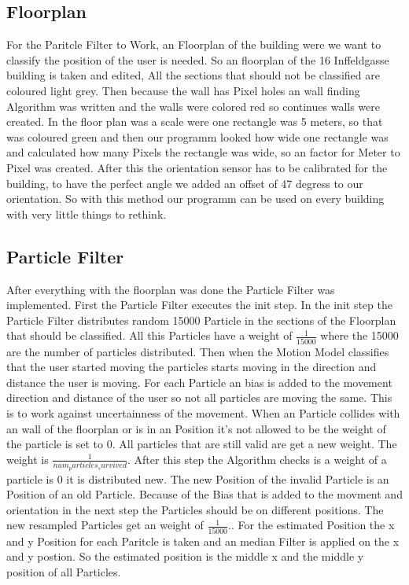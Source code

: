 \documentclass[conference]{IEEEtran}
\begin{document}
\subsection*{Floorplan}
For the Paritcle Filter to Work, an Floorplan of the building were we want to classify the position of the user is needed. So an floorplan of the 16 Inffeldgasse building is taken and edited, All the sections that should not be classified are coloured light grey. Then because the wall has Pixel holes an wall finding Algorithm was written and the walls were colored red so continues walls were created. In the floor plan was a scale were one rectangle was 5 meters, so that was coloured green and then our programm looked how wide one rectangle was and calculated how many Pixels the rectangle was wide, so an factor for Meter to Pixel was created. After this the orientation sensor has to be calibrated for the building, to have the perfect angle we added an offset of 47 degress to our orientation. So with this method our programm can be used on every building with very little things to rethink.


\subsection*{Particle Filter}

After everything with the floorplan was done the Particle Filter was implemented. 
First the Particle Filter executes the init step. In the init step the Particle Filter distributes random 15000 Particle in the sections of the Floorplan that should be classified. All this Particles have a weight of $\frac{1}{15000} $ where the 15000 are the number of particles distributed.
Then when the Motion Model classifies that the user started moving the particles starts moving in the direction and distance the user is moving. For each Particle an bias is added to the movement direction and distance of the user so not all particles are moving the same. This is to work against uncertainness of the movement. When an Particle collides with an wall of the floorplan or is in an Position it's not allowed to be the weight of the particle is set to 0. All particles that are still valid are get a new weight. The weight is  $\frac{1}{num_particles_survived} $. After this step the Algorithm checks is a weight of a particle is 0 it is distributed new. The new Position of the invalid Particle is an Position of an old Particle. Because of the Bias that is added to the movment and orientation in the next step the Particles should be on different positions. The new resampled Particles get an weight of $\frac{1}{15000}.$. For the estimated Position the x and y Position for each Paritcle is taken and an median Filter is applied on the x and y postion. So the estimated position is the middle x and the middle y position of all Particles.
\end{document}
